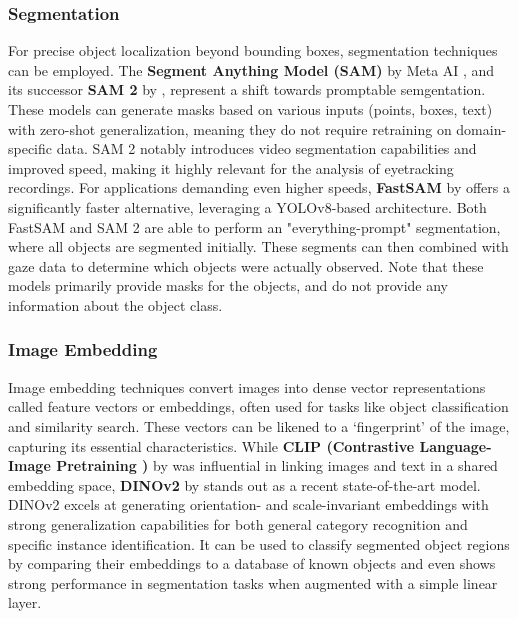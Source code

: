 \documentclass[english]{hogent-article}
\begin{document}
\subsubsection{Segmentation}

For precise object localization beyond bounding boxes, segmentation techniques can be employed.
The \textbf{Segment Anything Model (SAM)} by Meta AI \autocite{Kirillov2023}, 
and its successor \textbf{SAM 2} by \textcite{Ravi2024}, represent a shift towards promptable semgentation.
These models can generate masks based on various inputs (points, boxes, text) with zero-shot 
generalization, meaning they do not require retraining on domain-specific data.
SAM 2 notably introduces video segmentation capabilities and improved speed, making it highly relevant for the analysis of eyetracking recordings.
For applications demanding even higher speeds, \textbf{FastSAM} by \textcite{Zhao2023} offers a significantly faster alternative, leveraging a YOLOv8-based architecture.
Both FastSAM and SAM 2 are able to perform an "everything-prompt" segmentation, where all objects are segmented initially.
These segments can then combined with gaze data to determine which objects were actually observed.
Note that these models primarily provide masks for the objects, and do not provide any information about the object class.

\subsubsection{Image Embedding}

Image embedding techniques convert images into dense vector representations called feature vectors or embeddings, 
often used for tasks like object classification and similarity search.
These vectors can be likened to a `fingerprint' of the image, capturing its essential characteristics.
While \textbf{CLIP (Contrastive Language-Image Pretraining )} by \textcite{Radford2021} was influential in linking images and text in a shared embedding space,
\textbf{DINOv2} by \textcite{Oquab2024} stands out as a recent state-of-the-art model. 
DINOv2 excels at generating orientation- and scale-invariant embeddings with strong generalization capabilities 
for both general category recognition and specific instance identification. 
It can be used to classify segmented object regions by comparing their embeddings to a database of 
known objects and even shows strong performance in segmentation tasks when augmented with a simple linear layer.
\end{document}
